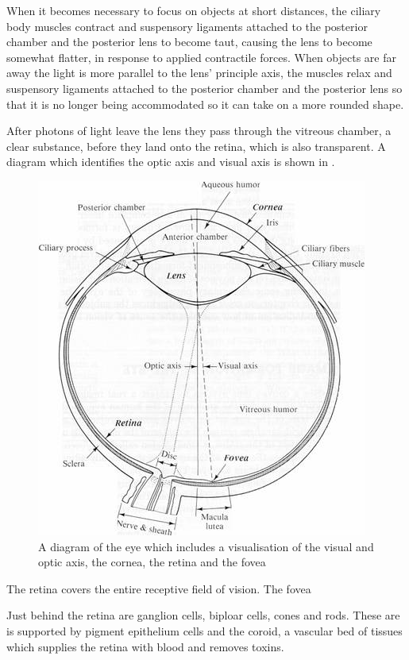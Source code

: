 When it becomes necessary to focus on objects at short distances, the
ciliary body muscles contract and suspensory ligaments attached to the
posterior chamber and the posterior lens to become taut, causing the
lens to become somewhat flatter, in response to applied contractile
forces. When objects are far away the light is more parallel to the
lens' principle axis, the muscles relax and suspensory ligaments
attached to the posterior chamber and the posterior lens so that it
is no longer being accommodated so it can take on a more rounded shape.

After photons of light leave the lens they pass through the vitreous
chamber, a clear substance, before they land onto the retina, which
is also transparent. A diagram which identifies the optic axis and
visual axis is shown in .

\begin{figure}[htbp]
  \centering
    \includegraphics{figures/eye_diagram}
  \caption{A diagram of the eye which includes a visualisation of the visual
   and optic axis, the cornea, the retina and the fovea}
  \label{fig:optic_axis}
\end{figure}

The retina covers the entire receptive field of vision.\cite{} The fovea

Just behind the retina are ganglion cells, biploar cells, cones and rods.
These are is supported by pigment epithelium cells and the coroid, a vascular bed
of tissues which supplies the retina with blood and removes toxins.
\cite{lutty1996localization}

